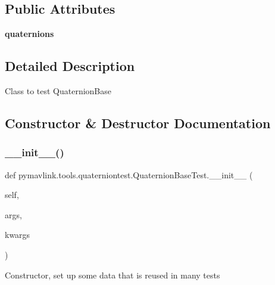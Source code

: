 \subsection*{Public Attributes}
\begin{DoxyCompactItemize}
\item 
\mbox{\label{classpymavlink_1_1tools_1_1quaterniontest_1_1QuaternionBaseTest_a7e9a38f1a1a5988b4587a102d9eaa914}} 
{\bfseries quaternions}
\end{DoxyCompactItemize}


\subsection{Detailed Description}
\begin{DoxyVerb}Class to test QuaternionBase
\end{DoxyVerb}
 

\subsection{Constructor \& Destructor Documentation}
\mbox{\label{classpymavlink_1_1tools_1_1quaterniontest_1_1QuaternionBaseTest_ad82d8790ff394411bd472f03b7e5b144}} 
\subsubsection{\texorpdfstring{\+\_\+\+\_\+init\+\_\+\+\_\+()}{\_\_init\_\_()}}
{\footnotesize\ttfamily def pymavlink.\+tools.\+quaterniontest.\+Quaternion\+Base\+Test.\+\_\+\+\_\+init\+\_\+\+\_\+ (\begin{DoxyParamCaption}\item[{}]{self,  }\item[{}]{args,  }\item[{}]{kwargs }\end{DoxyParamCaption})}

\begin{DoxyVerb}Constructor, set up some data that is reused in many tests\end{DoxyVerb}
 

